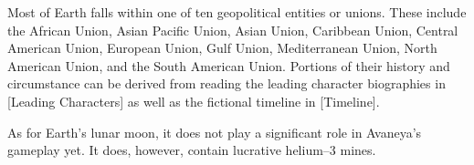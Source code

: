 

Most of Earth falls within one of ten geopolitical entities or unions. These include the African Union, Asian Pacific Union, Asian Union, Caribbean Union, Central American Union, European Union, Gulf Union, Mediterranean Union, North American Union, and the South American Union. Portions of their history and circumstance can be derived from reading the leading character biographies in [Leading Characters] as well as the fictional timeline in [Timeline].

As for Earth's lunar moon, it does not play a significant role in Avaneya's gameplay yet. It does, however, contain lucrative helium--3 mines.

